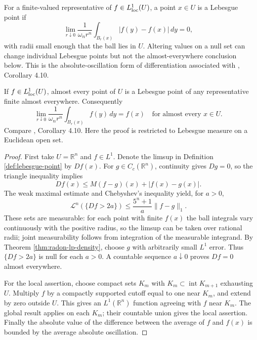 \begin{definition}\label{def:lebesgue-point}
For a finite-valued representative of $f\in L^1_{\rm loc}(U)$, a point $x\in U$ is a Lebesgue point if
\[
 \lim_{r\downarrow0}\frac{1}{\omega_n r^n}
       \int_{B_r(x)}|f(y)-f(x)|\,dy=0,
\]
with radii small enough that the ball lies in $U$. Altering values on a null set can change individual Lebesgue points but not the almost-everywhere conclusion below. This is the absolute-oscillation form of differentiation associated with \cite{Sim18}, Corollary 4.10.
\end{definition}

\begin{theorem}\label{thm:lebesgue-differentiation}
If $f\in L^1_{\rm loc}(U)$, almost every point of $U$ is a Lebesgue point of any representative finite almost everywhere. Consequently
\[
 \lim_{r\downarrow0}\frac{1}{\omega_n r^n}\int_{B_r(x)}f(y)\,dy=f(x)
 \quad\text{for almost every }x\in U.
\]
Compare \cite{Sim18}, Corollary 4.10. Here the proof is restricted to Lebesgue measure on a Euclidean open set.
\end{theorem}
\begin{proof}
First take $U=\mathbb R^n$ and $f\in L^1$. Denote the limsup in Definition \ref{def:lebesgue-point} by $Df(x)$. For $g\in C_c(\mathbb R^n)$, continuity gives $Dg=0$, so the triangle inequality implies
\[
 Df(x)\leq M(f-g)(x)+|f(x)-g(x)|.
\]
The weak maximal estimate and Chebyshev's inequality yield, for $a>0$,
\[
 \mathcal L^n(\{Df>2a\})\leq\frac{5^n+1}{a}\|f-g\|_1.
\]
These sets are measurable: for each point with finite $f(x)$ the ball integrals vary continuously with the positive radius, so the limsup can be taken over rational radii; joint measurability follows from integration of the measurable integrand. By Theorem \ref{thm:radon-lp-density}, choose $g$ with arbitrarily small $L^1$ error. Thus $\{Df>2a\}$ is null for each $a>0$. A countable sequence $a\downarrow0$ proves $Df=0$ almost everywhere.

For the local assertion, choose compact sets $K_m$ with $K_m\subset\operatorname{int}K_{m+1}$ exhausting $U$. Multiply $f$ by a compactly supported cutoff equal to one near $K_m$, and extend by zero outside $U$. This gives an $L^1(\mathbb R^n)$ function agreeing with $f$ near $K_m$. The global result applies on each $K_m$; their countable union gives the local assertion. Finally the absolute value of the difference between the average of $f$ and $f(x)$ is bounded by the average absolute oscillation.
\end{proof}

